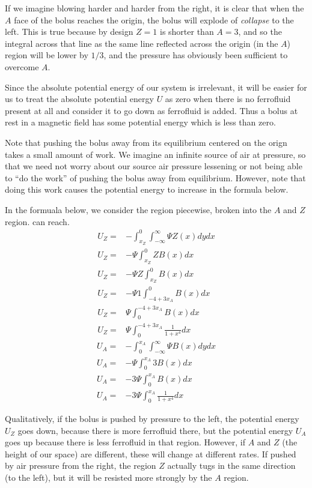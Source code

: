 \documentclass{asme2ej}
\begin{document}
If we imagine blowing harder and harder from the right, it is
clear that when the $A$ face of the bolus reaches the origin,
the bolus will explode of {\em collapse} to the left.
This is true because by design $Z =1 $ is shorter than $A =3$, and
so the integral across that line as the same line reflected across
the origin (in the $A$) region will be lower by $1/3$, and the pressure
has obviously been sufficient to overcome $A$.

Since the absolute potential energy of our system is irrelevant,
it will be easier for us to treat the absolute potential energy $U$
as zero when there is no ferrofluid present at all and consider it to go down as ferrofluid is added.
Thus a bolus at rest in a magnetic field has some potential energy which is
less than zero.

Note that pushing the bolus away from its equilibrium
centered on the orign takes a small amount of work.
We imagine an infinite source
of air at pressure, so that we need not worry
about our source air pressure lessening or not being able
to ``do the work'' of pushing the bolus away from equilibrium.
However, note that doing this work
causes the potential energy to increase in the formula below.


In the formuala below, we consider the region piecewise,
broken into the $A$ and $Z$ region.
can reach.
\begin{align}
  U_Z = & -\int_{x_Z}^0 \int_{-\infty}^{\infty}  \Psi Z(x) dy dx \\
  U_Z = & -\Psi\int_{x_Z}^0 Z B(x)  dx  \\
  U_Z = & - \Psi Z \int_{x_Z}^0 B(x)  dx \\
  U_Z = & - \Psi 1 \int_{ -4 + 3x_A}^0 B(x) dx \\
  U_Z = &  \Psi  \int_{0}^{ -4 + 3x_A} B(x) dx \\
  U_Z = &  \Psi  \int_{0}^{ -4 + 3x_A} \frac{1}{1+x^4} dx
\end{align}
\begin{align}
  U_A = &  -\int_0^{x_A} \int_{-\infty}^{\infty} \Psi B(x) dy dx \\
  U_A = &  -\Psi\int_0^{x_A} 3 B(x) dx \\
  U_A = &  -3 \Psi \int_0^{x_A} B(x) dx \\
  U_A = &  -3 \Psi \int_0^{x_A} \frac{1}{1+x^4} dx
\end{align}

Qualitatively, if the bolus is pushed by pressure to the left, the potential energy $U_Z$
goes down, because there is more ferrofluid there, but the potential energy $U_A$ goes up
because there is less ferrofluid in that region. However, if $A$ and $Z$ (the height of our space)
are different, these will change at different rates. If pushed by air pressure from the
right, the region $Z$ actually tugs in the same direction (to the left), but it
will be resisted more strongly by the $A$ region.
\end{document}
